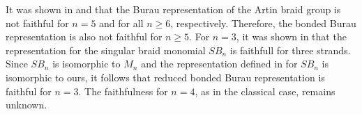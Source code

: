 \documentclass{article}
\theoremstyle{definition}
\newtheorem{definition}{Definition}[section]
\theoremstyle{plain}
\newtheorem{proposition}{Proposition}[section]
\theoremstyle{remark}
\begin{document}



It was shown in \cite{long1993burau} and \cite{bigelow1999burau} that the Burau representation of the Artin braid group is not faithful for $ n = 5 $ and for all $ n \geq 6 $, respectively. Therefore, the bonded Burau representation is also not faithful for $ n \geq 5 $. 
For $n=3$, it was shown in \cite{dasbach2000faithful} that the representation for the singular braid monomial $SB_n$ \cite{gemein1997singular} is faithfull for three strands. Since $SB_n$ is isomorphic to $M_n$ and the representation defined in \cite{dasbach2000faithful} for $SB_n$ is isomorphic to ours, it follows that reduced bonded Burau representation is faithful for $n = 3$.  The faithfulness for $n = 4$, as in the classical case, remains unknown.

    
\end{document}
